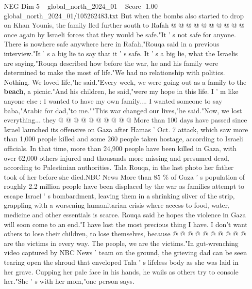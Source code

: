 \begin{textsample}{NEG Dim 5 – global\_north\_2024\_01 – Score -1.00 – global\_north\_2024\_01/105262483.txt}
But when the bombs also started to drop on Khan Younis, the family fled further south to Rafah @ @ @ @ @ @ @ @ @ @ once again by Israeli forces that they would be safe."It ' s not safe for anyone.
There is nowhere safe anywhere here in Rafah,"Rouqa said in a previous interview."It ' s a big lie to say that it ' s safe.
It ' s a big lie, what the Israelis are saying."Rouqa described how before the war, he and his family were determined to make the most of life."We had no relationship with politics.
Nothing.
We loved life,"he said."Every week, we were going out as a family to the \textbf{beach}, a picnic."And his children, he said,"were my hope in this life.
I ' m like anyone else : I wanted to have my own family....
I wanted someone to say baba,"Arabic for dad,"to me.""This war changed our lives,"he said."Now, we lost everything... they @ @ @ @ @ @ @ @ @ @ More than 100 days have passed since Israel launched its offensive on Gaza after Hamas ' Oct. 7 attack, which saw more than 1,000 people killed and some 260 people taken hostage, according to Israeli officials.
In that time, more than 24,900 people have been killed in Gaza, with over 62,000 others injured and thousands more missing and presumed dead, according to Palestinian authorities.
Tala Rouqa, in the last photo her father took of her before she died.NBC News More than 85 \% of Gaza ' s population of roughly 2.2 million people have been displaced by the war as families attempt to escape Israel ' s bombardment, leaving them in a shrinking sliver of the strip, grappling with a worsening humanitarian crisis where access to food, water, medicine and other essentials is scarce.
Rouqa said he hopes the violence in Gaza will soon come to an end."I have lost the most precious thing I have.
I don't want others to lose their children, to lose themselves, because @ @ @ @ @ @ @ @ @ @ are the victims in every way.
The people, we are the victims."In gut-wrenching video captured by NBC News ' team on the ground, the grieving dad can be seen tearing open the shroud that enveloped Tala ' s lifeless body as she was laid in her grave.
Cupping her pale face in his hands, he wails as others try to console her."She ' s with her mom,"one person says.

\end{textsample}
